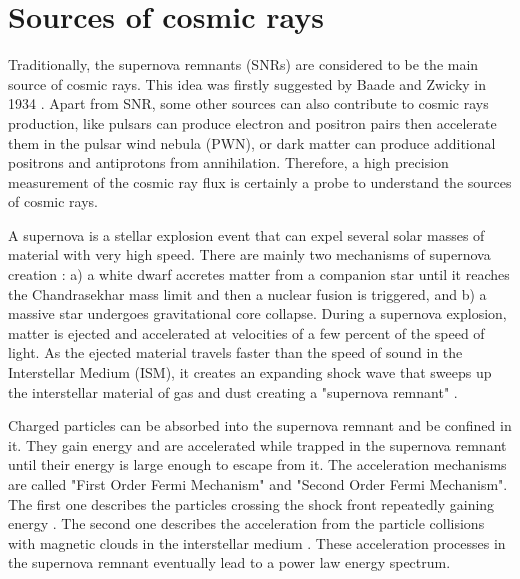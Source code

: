 
\section{Sources of cosmic rays}

Traditionally, the supernova remnants (SNRs) are considered to be the main source of cosmic rays. This idea was firstly suggested by Baade and Zwicky in 1934 \cite{CosmicRaysFromSuperNova}. Apart from SNR, some other sources can also contribute to cosmic rays production, like pulsars can produce electron and positron pairs then accelerate them in the pulsar wind nebula (PWN), or dark matter can produce additional positrons and antiprotons from annihilation. Therefore, a high precision measurement of the cosmic ray flux is certainly a probe to understand the sources of cosmic rays. \par

A supernova is a stellar explosion event that can expel several solar masses of material with very high speed. There are mainly two mechanisms of supernova creation \cite{SupernovaClassification}: a) a white dwarf accretes matter from a companion star until it reaches the Chandrasekhar mass limit and then a nuclear fusion is triggered, and b) a massive star undergoes gravitational core collapse. During a supernova explosion, matter is ejected and accelerated at velocities of a few percent of the speed of light. As the ejected material travels faster than the speed of sound in the Interstellar Medium (ISM), it creates an expanding shock wave that sweeps up the interstellar material of gas and dust creating a "supernova remnant" \cite{SupernovaRemnants}. \par

Charged particles can be absorbed into the supernova remnant and be confined in it. They gain energy and are accelerated while trapped in the supernova remnant until their energy is large enough to escape from it. The acceleration mechanisms are called "First Order Fermi Mechanism" and "Second Order Fermi Mechanism". The first one describes the particles crossing the shock front repeatedly gaining energy \cite{FirstFermiAcceleration}. The second one describes the acceleration from the particle collisions with magnetic clouds in the interstellar medium \cite{SecondFermiAcceleration}. These acceleration processes in the supernova remnant eventually lead to a power law energy spectrum.  \par

